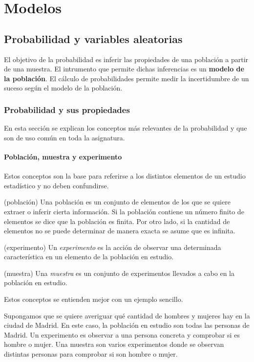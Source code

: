 \section{Modelos}
\subsection{Probabilidad y variables aleatorias}
El objetivo de la probabilidad es inferir las propiedades de una población a partir de una muestra. El intrumento que permite dichas inferencias es un \textbf{modelo de la población}. El cálculo de probabilidades permite medir la incertidumbre de un suceso según el modelo de la población.
\subsubsection{Probabilidad y sus propiedades}
En esta sección se explican los conceptos más relevantes de la probabilidad y que son de uso común en toda la asignatura.\\\\
\textbf{Población, muestra y experimento}\\\\
Estos conceptos son la base para referirse a los distintos elementos de un estudio estadístico y no deben confundirse.
\begin{definition}(población)
Una población es un conjunto de elementos de los que se quiere extraer o inferir cierta información. Si la población contiene un número finito de elementos se dice que la población es finita. Por otro lado, si la cantidad de elementos no se puede determinar de manera exacta se asume que es infinita.
	\label{def:población}
\end{definition}
\begin{definition}(experimento)
Un \textit{experimento} es la acción de observar una determinada característica en un elemento de la población en estudio.
	\label{def:experimento}
\end{definition}
\begin{definition}(muestra)
Una \textit{muestra} es un conjunto de experimentos llevados a cabo en la población en estudio.
	\label{def:muestra}
\end{definition}
Estos conceptos se entienden mejor con un ejemplo sencillo.
\begin{example}
Supongamos que se quiere averiguar qué cantidad de hombres y mujeres hay en la ciudad de Madrid. En este caso, la población en estudio son todas las personas de Madrid. Un experimento es observar a una persona concreta y comprobar si es hombre o mujer. Una muestra son varios experimentos donde se observan distintas personas para comprobar si son hombre o mujer.
	\label{ex: población}
\end{example}
